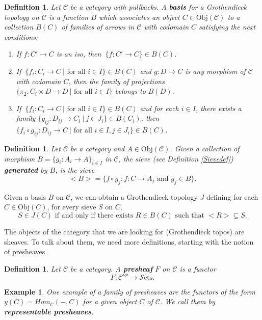 \documentclass[10pt,a4paper]{amsart}
\newtheorem{Def}[Theo]{Definition}
\newtheorem{Example}[Theo]{Example}
\newcommand{\C}{\mathcal{C}}
\newcommand{\Sets}{\mathcal{S}\text{ets}}
\begin{document}
\begin{Def}
	Let $\C$ be a category with pullbacks. A \textbf{basis} for a Grothendieck topology on $\C$ is a function $B$ which associates an object $C \in \text{Obj}(\C)$ to a collection $B(C)$ of families of arrows in $\C$ with codomain $C$ satisfying the next conditions:
	
	\begin{enumerate}
		\item If $f: C' \to C$ is an iso, then $~\{f:C' \to C\} \in B(C)$.
		
		\item If $~\{f_{i}: C_{i} \to C ~ |\text{ for all }i \in I\} \in B(C)$ and $g: D
		 \to C$ is any morphism of $\C$ with codomain $C$, then the family of projections $\{ \pi_{2}: C_{i} \times D \to D~|\text{ for all } i \in I\}$ belongs to $B(D)$.
		 
		\item If $~\{f_{i}: C_{i} \to C ~ |\text{ for all }i \in I\} \in B(C)$ and for each $i \in I$, there exists a family $\{g_{ij}: D_{ij} \to C_{i}~|~ j \in J_{i}\} \in B(C_{i})$, then $\{f_{i} \circ g_{ij}: D_{ij} \to C ~|\text{ for all }i \in I, j \in J_{i}\} \in B(C)$.
	\end{enumerate}
\end{Def}
\begin{Def}
	Let $\C$ be a category and $A \in \text{Obj}(\C)$. Given a collection of morphism $B = \{g_{i}:A_{i} \to A\}_{ i \in I }$ in $\C$, the sieve (see Definition \ref{Sievedef}) \textbf{generated} by $B$, is the sieve $$<B> = \{f \circ g_{j}: f: C \to A_{j} \text{ and } g_{j} \in B\}.$$ 
\end{Def}

Given a basis $B$ on $\C$, we can obtain a Grothendieck topology $J$ defining for each $C \in \text{Obj}(C)$, for every sieve $S$ on $C$,
$$S \in J(C) \text{ if and only if there exists } R \in B(C)\text{ such that }<R> \subseteq S. $$


The objects of the category that we are looking for (Grothendieck topos) are sheaves. To talk about them, we need more definitions, starting with the notion of presheaves. 

\begin{Def}\label{presheafdef}
	Let $\C$ be a category. A \textbf{presheaf} $F$ on $\C$ is a functor
	$$F: \C^{op} \to \Sets.$$
	
\end{Def}

\begin{Example}\label{Representablepresheaf}
One example of a family of presheaves are the functors of the form $y(C)=Hom_{\C}( - ,C)$ for a given object $C$ of $\C$. We call them by \textbf{representable presheaves}.
\end{Example}
\end{document}
